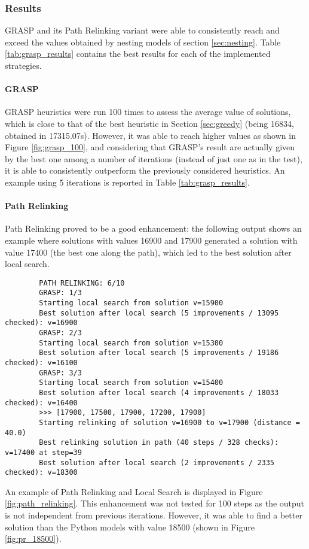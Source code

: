 \subsubsection{Results}
GRASP and its Path Relinking variant were able to consistently reach and exceed the values obtained by nesting models of section \ref{sec:nesting}. Table \ref{tab:grasp_results} contains the best results for each of the implemented strategies.

\paragraph{GRASP} GRASP heuristics were run 100 times to assess the average value of solutions, which is close to that of the best heuristic in Section \ref{sec:greedy} (being 16834, obtained in 17315.07s). However, it was able to reach higher values as shown in Figure \ref{fig:grasp_100}, and considering that GRASP's result are actually given by the best one among a number of iterations (instead of just one as in the test), it is able to consistently outperform the previously considered heuristics. An example using 5 iterations is reported in Table \ref{tab:grasp_results}.

\paragraph{Path Relinking} Path Relinking proved to be a good enhancement: the following output shows an example where solutions with values 16900 and 17900 generated a solution with value 17400 (the best one along the path), which led to the best solution after local search.

\begin{footnotesize}
	\begin{verbatim}
		PATH RELINKING: 6/10
		GRASP: 1/3
		Starting local search from solution v=15900
		Best solution after local search (5 improvements / 13095 checked): v=16900
		GRASP: 2/3
		Starting local search from solution v=15300
		Best solution after local search (5 improvements / 19186 checked): v=16100
		GRASP: 3/3
		Starting local search from solution v=15400
		Best solution after local search (4 improvements / 18033 checked): v=16400
		>>> [17900, 17500, 17900, 17200, 17900]
		Starting relinking of solution v=16900 to v=17900 (distance = 40.0)
		Best relinking solution in path (40 steps / 328 checks): v=17400 at step=39
		Best solution after local search (2 improvements / 2335 checked): v=18300
	\end{verbatim}
\end{footnotesize}
An example of Path Relinking and Local Search is displayed in Figure \ref{fig:path_relinking}. This enhancement was not tested for 100 steps as the output is not independent from previous iterations. However, it was able to find a better solution than the Python models with value 18500 (shown in Figure \ref{fig:pr_18500}). 

